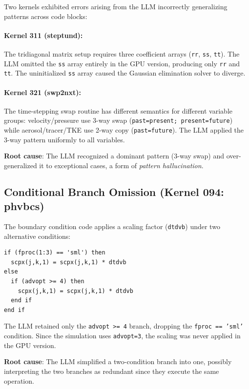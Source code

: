 \documentclass[conference]{IEEEtran}
\begin{document}
Two kernels exhibited errors arising from the LLM incorrectly generalizing
patterns across code blocks:

\paragraph{Kernel 311 (steptund):} The tridiagonal matrix setup requires
three coefficient arrays (\texttt{rr}, \texttt{ss}, \texttt{tt}). The LLM
omitted the \texttt{ss} array entirely in the GPU version, producing only
\texttt{rr} and \texttt{tt}. The uninitialized \texttt{ss} array caused
the Gaussian elimination solver to diverge.

\paragraph{Kernel 321 (swp2nxt):} The time-stepping swap routine has
different semantics for different variable groups: velocity/pressure use
3-way swap (\texttt{past=present; present=future}) while aerosol/tracer/TKE
use 2-way copy (\texttt{past=future}). The LLM applied the 3-way pattern
uniformly to all variables.

\textbf{Root cause}: The LLM recognized a dominant pattern (3-way swap) and
over-generalized it to exceptional cases, a form of \emph{pattern
hallucination}.

\subsection{Conditional Branch Omission (Kernel 094: phvbcs)}

The boundary condition code applies a scaling factor (\texttt{dtdvb}) under
two alternative conditions:

\begin{lstlisting}[style=fortran, caption={Correct conditional logic.}, label={lst:fproc}]
if (fproc(1:3) == 'sml') then
  scpx(j,k,1) = scpx(j,k,1) * dtdvb
else
  if (advopt >= 4) then
    scpx(j,k,1) = scpx(j,k,1) * dtdvb
  end if
end if
\end{lstlisting}

The LLM retained only the \texttt{advopt >= 4} branch, dropping the
\texttt{fproc == 'sml'} condition. Since the simulation uses
\texttt{advopt=3}, the scaling was never applied in the GPU version.

\textbf{Root cause}: The LLM simplified a two-condition branch into one,
possibly interpreting the two branches as redundant since they execute the
same operation.
\end{document}
